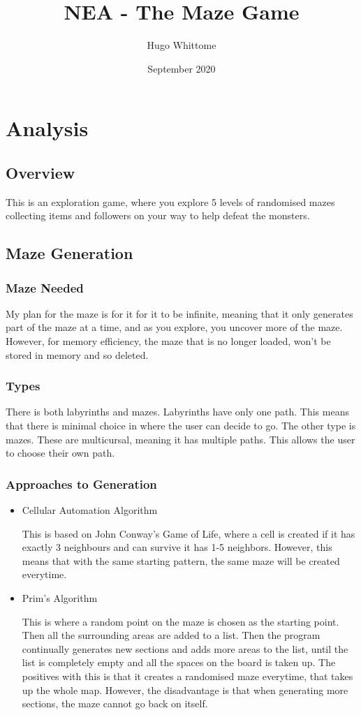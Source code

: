 \documentclass{article}
\title{NEA - The Maze Game}
\author{Hugo Whittome}
\date{September 2020}
\begin{document}
    \maketitle
    \section{Analysis}
        \subsection{Overview}
            This is an exploration game, where you explore 5 levels of randomised mazes collecting items and followers on your way to help defeat the monsters.
        \subsection{Maze Generation}
            \subsubsection{Maze Needed}
                My plan for the maze is for it for it to be infinite, meaning that it only generates part of the maze at a time, and as you explore, you uncover more of the maze. However, for memory efficiency, the maze that is no longer loaded, won't be stored in memory and so deleted.
            \subsubsection{Types}
                There is both labyrinths and mazes. Labyrinths have only one path. This means that there is minimal choice in where the user can decide to go.
                The other type is mazes. These are multicursal, meaning it has multiple paths. This allows the user to choose their own path.
            \subsubsection{Approaches to Generation}
                \begin{itemize}
                    \item Cellular Automation Algorithm

                    This is based on John Conway's Game of Life, where a cell is created if it has exactly 3 neighbours and can survive it has 1-5 neighbors. However, this means that with the same starting pattern, the same maze will be created everytime.

                    \item Prim's Algorithm

                    This is where a random point on the maze is chosen as the starting point. Then all the surrounding areas are added to a list. Then the program continually generates new sections and adds more areas to the list, until the list is completely empty and all the spaces on the board is taken up. The positives with this is that it creates a randomised maze everytime, that takes up the whole map. However, the disadvantage is that when generating more sections, the maze cannot go back on itself.
                \end{itemize}
\end{document}
